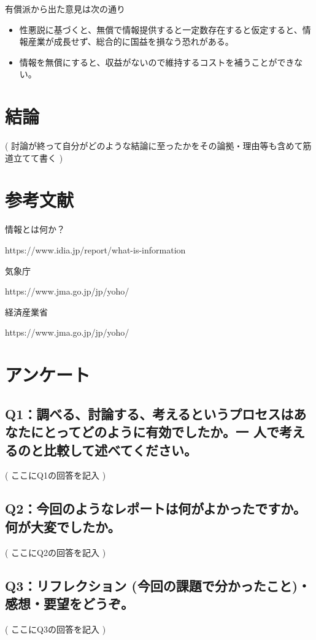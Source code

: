 \documentclass[12pt,a4j]{jarticle}
\begin{document}
有償派から出た意見は次の通り

\begin{itemize}
\item 性悪説に基づくと、無償で情報提供すると一定数存在すると仮定すると、情報産業が成長せず、総合的に国益を損なう恐れがある。
\item 情報を無償にすると、収益がないので維持するコストを補うことができない。
\end{itemize}

\section{結論}
( 討論が終って自分がどのような結論に至ったかをその論拠・理由等も含めて筋道立てて書く )

\section{参考文献}

情報とは何か？

https://www.idia.jp/report/what-is-information

気象庁

https://www.jma.go.jp/jp/yoho/

経済産業省

https://www.jma.go.jp/jp/yoho/

\section{アンケート}

\subsection{Q1：調べる、討論する、考えるというプロセスはあなたにとってどのように有効でしたか。一 人で考えるのと比較して述べてください。}
( ここにQ1の回答を記入 )

\subsection{Q2：今回のようなレポートは何がよかったですか。何が大変でしたか。}
( ここにQ2の回答を記入 )

\subsection{Q3：リフレクション (今回の課題で分かったこと)・感想・要望をどうぞ。}
( ここにQ3の回答を記入 )
\end{document}
